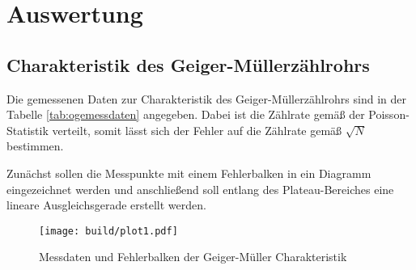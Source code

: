 \section{Auswertung}

\subsection{Charakteristik des Geiger-Müllerzählrohrs}

Die gemessenen Daten zur Charakteristik des Geiger-Müllerzählrohrs sind in der Tabelle \ref{tab:ogemessdaten}
angegeben. Dabei ist die Zählrate gemäß der Poisson-Statistik verteilt, somit lässt sich der Fehler auf die Zählrate gemäß $\sqrt{N}$
bestimmen.

Zunächst sollen die Messpunkte mit einem Fehlerbalken in ein Diagramm eingezeichnet werden und anschließend soll entlang des Plateau-Bereiches
eine lineare Ausgleichsgerade erstellt werden.

\begin{figure}[h]
  \centering
  \texttt{[image: build/plot1.pdf]}
  \caption{Messdaten und Fehlerbalken der Geiger-Müller Charakteristik}
  \label{fig:plot1}
\end{figure}